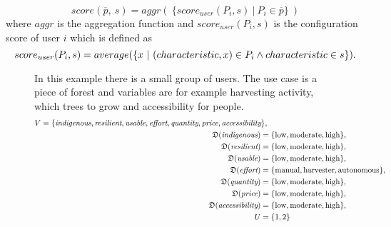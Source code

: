 \begin{equation}
    score(\overline{p},\ s) = aggr( \ \{score_{user}(P_i, s) \ | \ P_i \in \overline{p} \} \ )
\end{equation}
where $aggr$ is the aggregation function and $score_{user}(P_i, s)$ is the configuration score of user $i$ which is defined as
\begin{equation}
    score_{user}(P_i, s) = average(\{x \ | \ (characteristic, x) \in P_i \land characteristic \in s \}) \notag . 
\end{equation}


\begin{figure}[htb]
    \begin{mdframed}[
        nobreak=true,
        frametitle={Example for Forestry Use Case},
        linecolor=black, 
        frametitlerulecolor=black, 
        frametitlebackgroundcolor=gray!5
    ]
        In this example there is a small group of users. The use case is a piece of forest and variables are for example harvesting activity, which trees to grow and accessibility for people.
        \begin{align}
            \begin{split}
                V = \{ & \textit{indigenous}, \textit{resilient}, \textit{usable}, \textit{effort}, \textit{quantity}, \textit{price}, \textit{accessibility} \},
            \end{split} \notag \\
            \mathfrak{D}(\textit{indigenous}) =  \{ & \text{low}, \text{moderate}, \text{high}\}, \notag \\
            \mathfrak{D}(\textit{resilient}) = \{ & \text{low}, \text{moderate}, \text{high}\}, \notag \\
            \mathfrak{D}(\textit{usable}) = \{ & \text{low}, \text{moderate}, \text{high}\}, \notag \\
            \mathfrak{D}(\textit{effort}) = \{ & \text{manual}, \text{harvester}, \text{autonomous}\}, \notag \\
            \mathfrak{D}(\textit{quantity}) = \{ & \text{low}, \text{moderate}, \text{high}\}, \notag \\
            \mathfrak{D}(\textit{price}) = \{ & \text{low}, \text{moderate}, \text{high}\}, \notag\\
            \mathfrak{D}(\textit{accessibility}) = \{ & \text{low}, \text{moderate}, \text{high}\},\notag \\
            U = \{ & 1,2\} \notag\\

\end{align}
\end{mdframed}
\end{figure}
